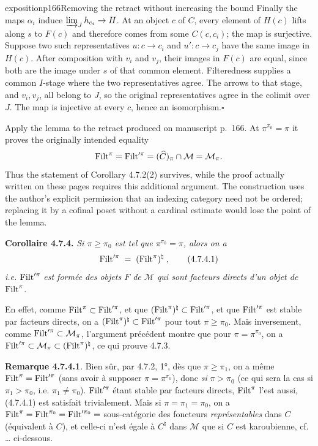 \begin{dcomment}{exposition}{p166}{Removing the retract without increasing the bound}
Finally the maps $\alpha_i$ induce $\varinjlim_Jh_{c_i}\to H$. At an object $c$ of $C$, every element of $H(c)$ lifts along $s$ to $F(c)$ and therefore comes from some $C(c,c_i)$; the map is surjective. Suppose two such representatives $u:c\to c_i$ and $u':c\to c_j$ have the same image in $H(c)$. After composition with $v_i$ and $v_j$, their images in $F(c)$ are equal, since both are the image under $s$ of that common element. Filteredness supplies a common $I$-stage where the two representatives agree. The arrows to that stage, and $v_i,v_j$, all belong to $J$, so the original representatives agree in the colimit over $J$. The map is injective at every $c$, hence an isomorphism.\hfill$\square$

Apply the lemma to the retract produced on manuscript p.~166. At $\pi^{\pi_0}=\pi$ it proves the originally intended equality
\[
 \mathrm{Filt}^\pi=\mathrm{Filt}'^\pi=(\widehat C)_\pi\cap\mathcal M
 =\mathcal M_\pi.
\]
Thus the statement of Corollary 4.7.2(2) survives, while the proof actually written on these pages requires this additional argument. The construction uses the author's explicit permission that an indexing category need not be ordered; replacing it by a cofinal poset without a cardinal estimate would lose the point of the lemma.
\end{dcomment}


\textbf{Corollaire 4.7.4.} \textit{Si $\pi \geqslant \pi_0$ est tel que $\pi^{\pi_0} = \pi$, alors on a}
\[
\Filt'^{\pi} \;=\; (\Filt^{\pi})^{\natural} \;, \tag*{(4.7.4.1)}
\]
\textit{i.e.} $\mathrm{Filt}'^{\pi}$ \textit{est formée des objets $F$ de $\mathcal{M}$ qui sont facteurs directs d’un objet de} $\mathrm{Filt}^{\pi}$.

En effet, comme $\mathrm{Filt}^{\pi} \subset \mathrm{Filt}'^{\pi}$, et que $(\mathrm{Filt}^{\pi})^{\natural} \subset \mathrm{Filt}'^{\pi}$, et que $\mathrm{Filt}'^{\pi}$ est stable par facteurs directs, on a $(\mathrm{Filt}^{\pi})^{\natural} \subset \mathrm{Filt}'^{\pi}$ pour tout $\pi \geqslant \pi_0$. Mais inversement, comme $\mathrm{Filt}'^{\pi} \subset \mathcal{M}_{\pi}$, l’argument précédent montre que pour $\pi = \pi^{\pi_0}$, on a $\mathrm{Filt}'^{\pi} \subset \mathcal{M}_{\pi} \subset (\mathrm{Filt}^{\pi})^{\natural}$, ce qui prouve 4.7.3.

\textbf{Remarque 4.7.4.1}. Bien sûr, par 4.7.2, 1°, dès que $\pi \geqslant \pi_1$, on a même $\mathrm{Filt}^{\pi} = \mathrm{Filt}'^{\pi}$ (sans avoir à supposer $\pi = \pi^{\pi_0}$), donc \textit{si} $\pi > \pi_0$ (ce qui sera la cas si $\pi_1 > \pi_0$, i.e. $\pi_1 \neq \pi_0$). $\mathrm{Filt}'^{\pi}$ étant stable par facteurs directs, $\mathrm{Filt}^{\pi}$ l’est aussi, (4.7.4.1) est satisfait trivialement. Mais si $\pi = \pi_1 = \pi_0$, on a $\mathrm{Filt}^{\pi} = \mathrm{Filt}^{\pi_0} = \mathrm{Filt}'^{\pi_0} =$ sous-catégorie des foncteurs \textit{représentables} dans $C$ (équivalent à $C$), et celle-ci n’est égale à $C^{\natural}$ dans $\mathcal{M}$ que si $C$ est karoubienne, cf. \ldots{} ci-dessous. %

